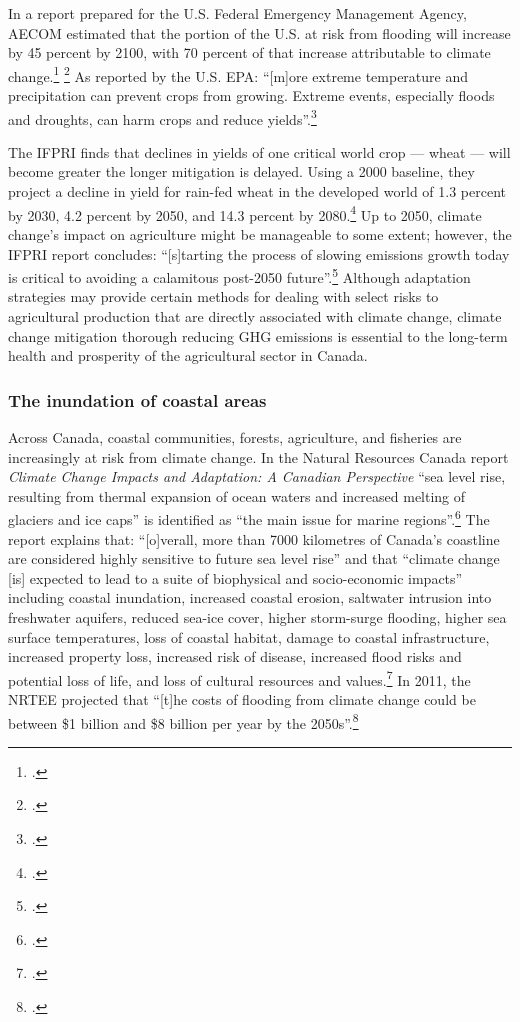 \documentclass[10pt]{article}
\begin{document}
In a report prepared for the U.S. Federal Emergency Management Agency, AECOM estimated that the portion of the U.S. at risk from flooding will increase by 45 percent by 2100, with 70 percent of that increase attributable to climate change.\footcite[][p. ES-7]{FEMAFlood} \footcite[See also: ][]{MJFlood}
As reported by the U.S. EPA: ``[m]ore extreme temperature and precipitation can prevent crops from growing. Extreme events, especially floods and droughts, can harm crops and reduce yields''.\footcite[][]{EPAAgFoodImpacts}



The IFPRI finds that declines in yields of one critical world crop --- wheat --- will become greater the longer mitigation is delayed. 
Using a 2000 baseline, they project a decline in yield for rain-fed wheat in the developed world of 1.3 percent by 2030, 4.2 percent by 2050, and 14.3 percent by 2080.\footcite[][p. 85]{Farming2050}
Up to 2050, climate change's impact on agriculture might be manageable to some extent; however, the IFPRI report concludes: ``[s]tarting the process of slowing emissions growth today is critical to avoiding a calamitous post-2050 future''.\footcite[][p. xxi]{Farming2050}
Although adaptation strategies may provide certain methods for dealing with select risks to agricultural production that are directly associated with climate change, climate change mitigation thorough reducing GHG emissions is essential to the long-term health and prosperity of the agricultural sector in Canada.



	\subsubsection{The inundation of coastal areas}
	\label{sec:inundationcoastal}

	
	
Across Canada, coastal communities, forests, agriculture, and fisheries are increasingly at risk from climate change.
In the Natural Resources Canada report \emph{Climate Change Impacts and Adaptation: A Canadian Perspective}  ``sea level rise, resulting from thermal expansion of ocean waters and increased melting of glaciers and ice caps'' is identified as ``the main issue for marine regions''.\footcite[][p. xvi]{Lemmen2010}
The report explains that: ``[o]verall, more than 7000 kilometres of Canada's coastline are considered highly sensitive to future sea level rise'' and that ``climate change [is] expected to lead to a suite of biophysical and socio-economic impacts'' including coastal inundation, increased coastal erosion, saltwater intrusion into freshwater aquifers, reduced sea-ice cover, higher storm-surge flooding, higher sea surface temperatures, loss of coastal habitat, damage to coastal infrastructure, increased property loss, increased risk of disease, increased flood risks and potential loss of life, and loss of cultural resources and values.\footcite[][p. xvii]{Lemmen2010}
In 2011, the NRTEE projected that ``[t]he costs of flooding from climate change could be between \$1 billion and \$8 billion per year by the 2050s''.\footcite[][p.16]{NRTEEPrice}
\end{document}
